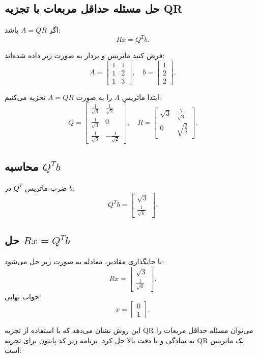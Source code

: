\subsection{حل مسئله حداقل مربعات با تجزیه QR}
اگر \(A = QR\) باشد:
\[
Rx = Q^T b.
\]
\begin{example}
	فرض کنید ماتریس و بردار به صورت زیر داده شده‌اند:
	\[
	A = \begin{bmatrix}
		1 & 1 \\
		1 & 2 \\
		1 & 3
	\end{bmatrix}, \quad
	b = \begin{bmatrix}
		1 \\
		2 \\
		2
	\end{bmatrix}.
	\]
\end{example}
\begin{solution}
	ابتدا ماتریس \(A\) را به صورت \(A = QR\) تجزیه می‌کنیم:
	\[
	Q = \begin{bmatrix}
		\frac{1}{\sqrt{3}} & \frac{1}{\sqrt{2}} \\
		\frac{1}{\sqrt{3}} & 0 \\
		\frac{1}{\sqrt{3}} & -\frac{1}{\sqrt{2}}
	\end{bmatrix}, \quad
	R = \begin{bmatrix}
		\sqrt{3} & \frac{7}{\sqrt{3}} \\
		0 & \sqrt{\frac{2}{3}}
	\end{bmatrix}.
	\]
	\subsection*{محاسبه \(Q^T b\)}
	ضرب ماتریس \(Q^T\) در \(b\):
	\[
	Q^T b = \begin{bmatrix}
		\sqrt{3} \\
		\frac{1}{\sqrt{6}}
	\end{bmatrix}.
	\]
	\subsection*{حل \(Rx = Q^T b\)}
	با جایگذاری مقادیر، معادله به صورت زیر حل می‌شود:
	\[
	Rx = \begin{bmatrix}
		\sqrt{3} \\
		\frac{1}{\sqrt{6}}
	\end{bmatrix}.
	\]
	جواب نهایی:
	\[
	x = \begin{bmatrix}
		0 \\
		1
	\end{bmatrix}.
	\]
\end{solution}
این روش نشان می‌دهد که با استفاده از تجزیه QR می‌توان مسئله حداقل مربعات را به سادگی و با دقت بالا حل کرد. برنامه زیر کد پایتون برای تجزیه QR یک ماتریس است:

